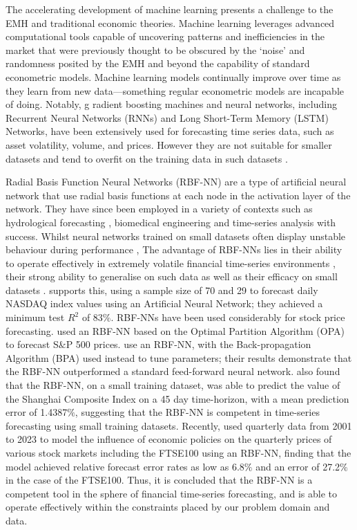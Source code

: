 \documentclass[11pt,a4paper]{article}
\newcommand{\citeboth}[1]{\citeauthor{#1} \citep{#1}}
\begin{document}
The accelerating development of machine learning presents a challenge to the EMH
and traditional economic theories. 
Machine learning leverages advanced computational 
tools capable of uncovering patterns and inefficiencies 
in the market that were previously thought to be obscured by the 
‘noise’ and randomness posited by the EMH and beyond the capability 
of standard econometric models. Machine learning models continually 
improve over time as they learn from new data—something regular 
econometric models are incapable of doing. Notably, g
radient boosting machines and neural networks, including 
Recurrent Neural Networks (RNNs) and Long Short-Term Memory (LSTM) 
Networks, have been extensively used for forecasting time series data, 
such as asset volatility, volume, and prices. However they 
are not suitable for smaller datasets and tend to overfit on the training data
in such datasets \citep{foster1992}.

Radial Basis Function Neural Networks (RBF-NN) are a type of artificial 
neural network that use radial basis functions at each node in the 
activation layer of the network. They have since been employed in a variety of contexts such as 
hydrological forecasting \citep{chang2001}, biomedical engineering 
\citep{ibrikci2002} and time-series analysis \citep{xiong2015} with success. 
Whilst neural networks trained on small datasets often display unstable 
behaviour during performance \citep{lebaron1998}, The advantage of 
RBF-NNs lies in their ability to 
operate effectively in extremely volatile financial time-series 
environments \citep{cafferata2019}, their strong ability to 
generalise on such data \citep{sharkawy2020} as well as their efficacy on small datasets \citep{kosarac2022}. 
\citeboth{esfandyari2016}
supports this, using a sample size of 70 and 29 to forecast daily NASDAQ 
index values using an Artificial Neural Network; they achieved a minimum
test $R^2$ of 83$\%$. RBF-NNs have been used 
considerably for stock price forecasting. \citeboth{cao2004} 
used an RBF-NN based on the Optimal Partition Algorithm (OPA) to 
forecast S$\&$P 500 prices. \citeboth{dass2019} use an RBF-NN, with the Back-propagation 
Algorithm (BPA) used instead to tune parameters; their results demonstrate 
that the RBF-NN outperformed a standard feed-forward neural network. 
\citeboth{ji2014} also found that the RBF-NN, on a 
small training dataset, was able to predict the value 
of the Shanghai Composite Index on a 45 day time-horizon, with a mean prediction error of 
1.4387$\%$, suggesting that the RBF-NN is competent in time-series 
forecasting using small training datasets. Recently, \citeboth{abotaleb2024}
used quarterly data from 2001 to 2023 to model the influence of economic 
policies on the quarterly prices of various stock markets including the 
FTSE100 using an RBF-NN, finding that the model 
achieved relative forecast error rates as low as 6.8$\%$ and an error of 
27.2$\%$ in the case of the FTSE100. Thus, it is concluded that the RBF-NN is a 
competent tool in the sphere of financial time-series forecasting, and 
is able to operate effectively within the constraints placed by our 
problem domain and data.
\end{document}
